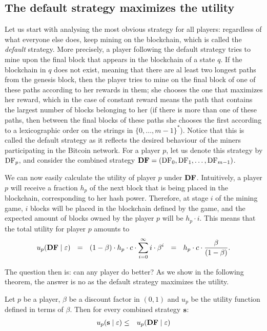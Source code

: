  \subsection{The default strategy maximizes the utility}

Let us start with analysing the most obvious strategy for all players: regardless of what everyone else does, keep mining on the blockchain, which is called the \emph{default} strategy.
More precisely, a player following the default strategy tries to mine upon the final block that appears in the blockchain of a state $q$. If the blockchain in $q$ does not exist, meaning that there are al least two longest paths from the genesis block, then the player tries to mine on the final block of one of these paths according to her rewards in them; she chooses the one that maximizes her reward, which in the case of constant reward means the path that contains the largest number of blocks belonging to her (if there is more than one of these paths, then between the final blocks of these paths she chooses the first according to a lexicographic order on the strings in $\{0, \ldots, m-1\}^*$). 
Notice that this is called the default strategy as it reflects the desired behaviour of the miners participating in the Bitcoin network.  For a player $p$, let us denote this strategy 
by $\text{\rm DF}_p$, and consider the combined strategy $\text{\rm {\bf DF}} = (\text{\rm DF}_0,\text{\rm DF}_1,\dots,\text{\rm DF}_{m-1})$. 

We can now easily calculate the utility of player $p$ under $\text{\rm {\bf DF}}$. Intuitively, a player $p$ will receive a fraction $h_p$ of the next block that is being placed in the blockchain, corresponding to her hash power. Therefore, at stage $i$ of the mining game, $i$ blocks will be placed in the blockchain defined by the game, and the expected amount of blocks owned by the player $p$ will be $h_p\cdot i$. This means that the total utility for player $p$ amounts to 
$$u_p(\text{\rm {\bf DF}} \mid \varepsilon) \ \ = \ \ (1 - \beta) \cdot h_p \cdot c\cdot \sum_{i=0}^{\infty}i \cdot \beta^{i} \ \ =  \ \ h_p\cdot c \cdot \frac{\beta}{(1-\beta)}.$$


The question then is: can any player do better? As we show in the following theorem, the answer is no as the default strategy maximizes the utility. 
\begin{mythm}\label{thm-conts_dom_str}
Let $p$ be a player, $\beta$ be a discount factor in $(0,1)$ and $u_p$ be the utility function defined in terms of $\beta$. Then for every combined strategy $\mathbf{s}$:
\begin{eqnarray*}
u_p(\mathbf{s} \mid \varepsilon) & \leq & u_p(\text{\rm {\bf DF}} \mid \varepsilon)
\end{eqnarray*}
\end{mythm} 

